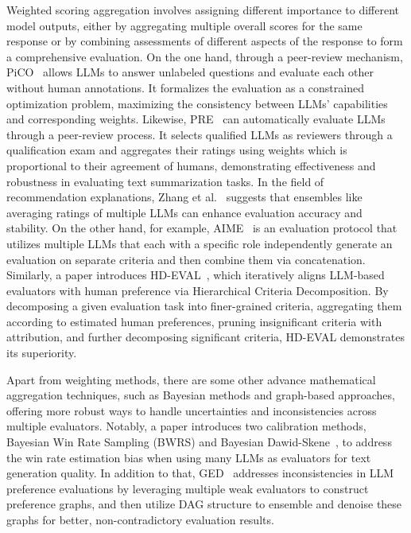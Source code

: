Weighted scoring aggregation involves assigning different importance to different model outputs, either by aggregating multiple overall scores for the same response or by combining assessments of different aspects of the response to form a comprehensive evaluation.
On the one hand, through a peer-review mechanism, PiCO~\cite{ning2024pico} allows LLMs to answer unlabeled questions and evaluate each other without human annotations. It formalizes the evaluation as a constrained optimization problem, maximizing the consistency between LLMs' capabilities and corresponding weights.
Likewise, PRE~\cite{chu2024pre,chen2024automaticcostefficientpeerreviewframework} can automatically evaluate LLMs through a peer-review process. It selects qualified LLMs as reviewers through a qualification exam and aggregates their ratings using weights which is proportional to their agreement of humans, demonstrating effectiveness and robustness in evaluating text summarization tasks.
In the field of recommendation explanations, Zhang et al.~\cite{zhang2024large} suggests that ensembles like averaging ratings of multiple LLMs can enhance evaluation accuracy and stability.
On the other hand, for example, AIME~\cite{patel2024aime} is an evaluation protocol that utilizes multiple LLMs that each with a specific role independently generate an evaluation on separate criteria and then combine them via concatenation.
Similarly, a paper introduces HD-EVAL~\cite{liu2024hd}, which iteratively aligns LLM-based evaluators with human preference via Hierarchical Criteria Decomposition. By decomposing a given evaluation task into finer-grained criteria, aggregating them according to estimated human preferences, pruning insignificant criteria with attribution, and further decomposing significant criteria, HD-EVAL demonstrates its superiority.

Apart from weighting methods, there are some other advance mathematical aggregation techniques, such as Bayesian methods and graph-based approaches, offering more robust ways to handle uncertainties and inconsistencies across multiple evaluators.
Notably, a paper introduces two calibration methods, Bayesian Win Rate Sampling (BWRS) and Bayesian Dawid-Skene~\cite{gao2024bayesian}, to address the win rate estimation bias when using many LLMs as evaluators for text generation quality.
In addition to that, GED~\cite{hu2024language} addresses inconsistencies in LLM preference evaluations by leveraging multiple weak evaluators to construct preference graphs, and then utilize DAG structure to ensemble and denoise these graphs for better, non-contradictory evaluation results.

